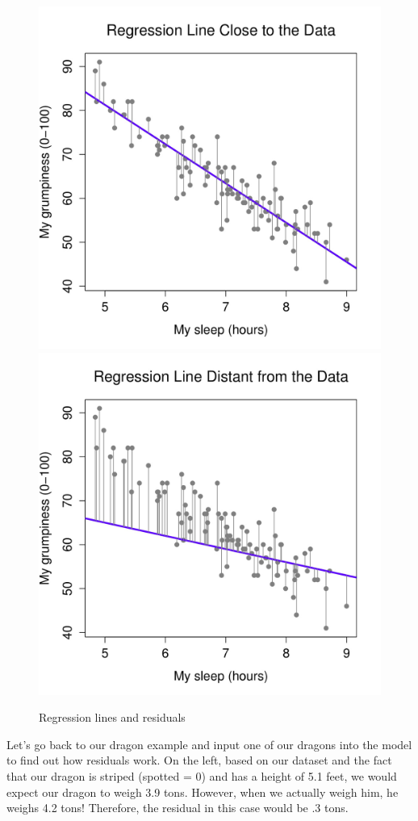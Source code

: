 \documentclass[
]{book}
\begin{document}
\begin{figure}

{\centering \includegraphics[width=0.49\linewidth]{images/13-regression/good-regression-line} \includegraphics[width=0.49\linewidth]{images/13-regression/bad-regression-line} 

}

\caption{Regression lines and residuals}\label{fig:unnamed-chunk-2}
\end{figure}

Let's go back to our dragon example and input one of our dragons into the model to find out how residuals work. On the left, based on our dataset and the fact that our dragon is striped (spotted = 0) and has a height of 5.1 feet, we would expect our dragon to weigh 3.9 tons. However, when we actually weigh him, he weighs 4.2 tons! Therefore, the residual in this case would be .3 tons.
\end{document}
